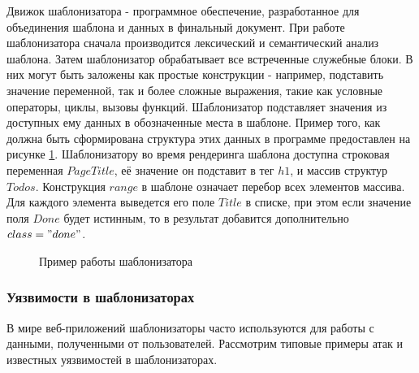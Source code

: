 \documentclass[a4paper]{article}
\begin{document}
Движок шаблонизатора - программное обеспечение, разработанное для объединения шаблона и данных в финальный документ. При работе шаблонизатора сначала производится лексический и семантический анализ шаблона. Затем шаблонизатор обрабатывает все встреченные служебные блоки. В них могут быть заложены как простые конструкции - например, подставить значение переменной, так и более сложные выражения, такие как условные операторы, циклы, вызовы функций. Шаблонизатор подставляет значения из доступных ему данных в обозначенные места в шаблоне. Пример того, как должна быть сформирована структура этих данных в программе предоставлен на рисунке \ref{GolangWorkExample}. Шаблонизатору во время рендеринга шаблона доступна строковая переменная $PageTitle$, её значение он подставит в тег $h1$, и массив структур $Todos$. Конструкция $range$ в шаблоне означает перебор всех элементов массива. Для каждого элемента выведется его поле $Title$ в списке, при этом если значение поля $Done$ будет истинным, то в результат добавится дополнительно $class="done"$.

\begin{figure}[!tbp]
\centering
{}
\hfill
{}
\caption{Пример работы шаблонизатора}
\label{GolangWorkExample}
\end{figure}

\subsubsection{Уязвимости в шаблонизаторах}
\indent

В мире веб-приложений шаблонизаторы часто используются для работы с данными, полученными от пользователей. Рассмотрим типовые примеры атак и известных уязвимостей в шаблонизаторах.
\end{document}
